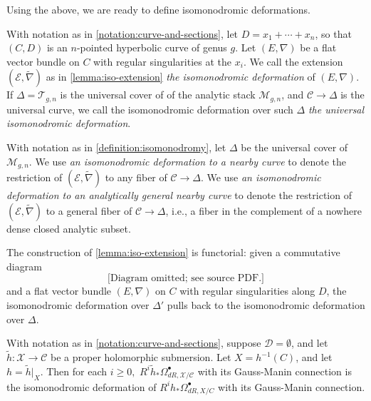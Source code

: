Using the above, we are ready to define isomonodromic deformations.
\begin{definition}
\notready
	\label{definition:isomonodromy}
	With notation as in \autoref{notation:curve-and-sections}, let $D=x_1+ \cdots+ x_n$, so that $(C, D)$ is an $n$-pointed hyperbolic curve of genus $g$. Let $(E, \nabla)$ be a flat vector bundle on $C$ with regular singularities at the $x_i$.
We call the extension $(\mathscr{E}, \widetilde{\nabla})$ as in
\autoref{lemma:iso-extension} \emph{the isomonodromic deformation} of $({E}, \nabla)$.
If $\Delta=\mathscr{T}_{g,n}$ is the universal cover of
of the analytic stack $\mathscr{M}_{g,n}$, and $\mathscr{C}\to \Delta$ is the universal curve,
we call the isomonodromic deformation over such $\Delta$  \emph{the universal
isomonodromic deformation}.
\end{definition}
\begin{definition}
\notready
	\label{definition:nearby}
	With notation as in \autoref{definition:isomonodromy}, let $\Delta$ be
	the universal cover of $\mathscr{M}_{g,n}$.
We use \emph{an isomonodromic deformation to a nearby curve} to denote the
restriction of $(\mathscr{E}, \widetilde{\nabla})$ to any fiber of $\mathscr{C}
\to \Delta$.
We use
\emph{an isomonodromic deformation to an analytically general nearby curve}
to denote the restriction of $(\mathscr{E}, \widetilde{\nabla})$ to a
general fiber of $\mathscr{C}
\to \Delta$, i.e., a fiber in the complement of a nowhere dense closed analytic
subset.
\end{definition}

\begin{remark}
\notready
	\label{remark:}
	The construction of \autoref{lemma:iso-extension} is functorial: given a commutative diagram
$$\text{[Diagram omitted; see source PDF.]}$$
and a flat vector bundle $({E}, \nabla)$ on $C$ with regular
singularities along $D$, the isomonodromic deformation over $\Delta'$ pulls back
to the isomonodromic deformation over $\Delta$.
\end{remark}
\begin{example}
\notready
	With notation as in \autoref{notation:curve-and-sections}, suppose $\mathscr{D}=\emptyset$, and let $\tilde h:
\mathscr{X}\to \mathscr{C}$ be a proper holomorphic submersion. Let
$X=h^{-1}(C)$, and let $h=\tilde h|_X$. Then for each $i\geq 0,$ $R^i\tilde
h_*\Omega^\bullet_{dR, \mathscr{X}/\mathscr{C}}$ with its Gauss-Manin connection
is the isomonodromic deformation of $R^ih_*\Omega^\bullet_{dR, X/C}$ with its
Gauss-Manin connection.
\end{example}

